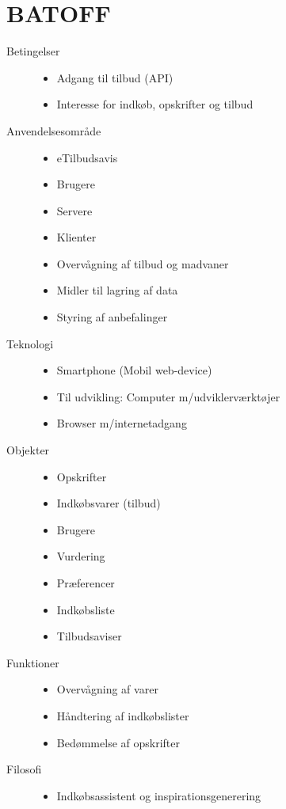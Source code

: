 \section{BATOFF}

\begin{description}
\item [Betingelser]\hfill
\begin{itemize}
\item Adgang til tilbud (API)
\item Interesse for indkøb, opskrifter og tilbud
\end{itemize}

\item [Anvendelsesområde]\hfill
\begin{itemize}
\item eTilbudsavis
\item Brugere
\item Servere
\item Klienter
\item Overvågning af tilbud og madvaner
\item Midler til lagring af data
\item Styring af anbefalinger
\end{itemize}

\item [Teknologi]\hfill
\begin{itemize}
\item Smartphone (Mobil web-device)
\item Til udvikling: Computer m/udviklerværktøjer
\item Browser m/internetadgang
\end{itemize}

\item [Objekter]\hfill
\begin{itemize}
\item Opskrifter
\item Indkøbsvarer (tilbud)
\item Brugere
\item Vurdering 
\item Præferencer
\item Indkøbsliste
\item Tilbudsaviser 
\end{itemize}

\item [Funktioner]\hfill
\begin{itemize}
\item Overvågning af varer 
\item Håndtering af indkøbslister
\item Bedømmelse af opskrifter
\end{itemize}

\item [Filosofi]\hfill
\begin{itemize}
\item Indkøbsassistent og inspirationsgenerering
\end{itemize}
\end{description}

 

